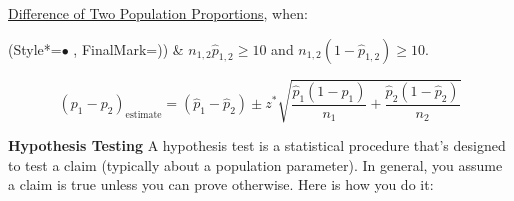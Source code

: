 \underline{Difference of Two Population Proportions}, when:
\begin{easylist}[itemize]
\ListProperties(Style*=$\bullet$ , FinalMark={)})
\vspace{-2.0mm}
& $n_{1,2}\hat{p}_{1,2}\geq10$ and $n_{1,2}(1-\hat{p}_{1,2})\geq10$.
\end{easylist}
% 
\vspace{-5.0mm}
\begin{equation}
(p_1 - p_2)_{\textrm{estimate}} = (\hat{p}_1 - \hat{p}_2) \pm z^{*} \sqrt{\frac{\hat{p}_1(1-\hat{p}_1)}{n_1}+ \frac{\hat{p}_2(1-\hat{p}_2)}{n_2}}
\end{equation}

\vspace{+3.5mm}
\textbf{Hypothesis Testing}
\newline
A hypothesis test is a statistical procedure that's designed to test a claim (typically about a population parameter).
In general, you assume a claim is true unless you can prove otherwise.
Here is how you do it:
\vspace{-3.5mm}
